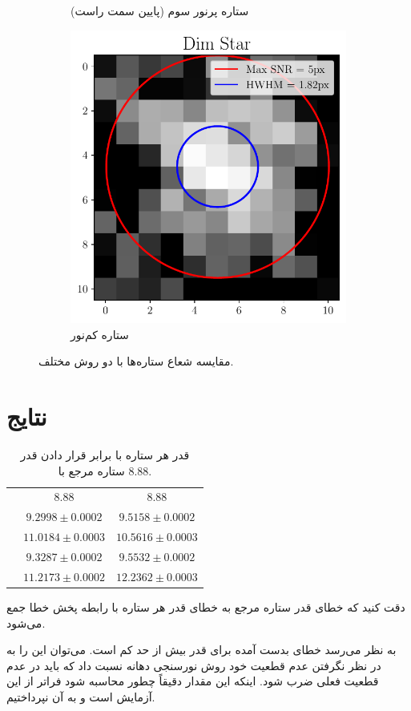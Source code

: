 \documentclass[12pt,a4paper]{article}
\begin{document}
\begin{figure}[h!]
\begin{subfigure}{0.49\linewidth}
			\caption{ستاره پرنور سوم (پایین سمت راست)}
		\end{subfigure}
		\begin{subfigure}{0.49\linewidth}
			\centering
			\includegraphics[width=\linewidth]{../fig/dim}
			\caption{ستاره کم‌نور}
		\end{subfigure}
		\caption{مقایسه شعاع ستاره‌ها با دو روش مختلف.}
	\end{figure}
	\restoregeometry
	\section{نتایج}
	\begin{table}[h!]
		\centering
		\caption{قدر هر ستاره با برابر قرار دادن قدر ستاره مرجع با $8.88$.}
		\begin{LTR}
			\begin{tabular}{|O{c}|c|c|}
				\hline
				 &  &  \\ \hline
				 & $8.88$ & $8.88$ \\ \hline
				 & $9.2998\pm0.0002$ & $9.5158\pm0.0002$ \\ \hline
				 & $11.0184\pm0.0003$ & $10.5616\pm0.0003$ \\ \hline
				 & $9.3287\pm0.0002$ & $9.5532\pm0.0002$ \\ \hline 
				 & $11.2173\pm0.0002$ & $12.2362\pm0.0003$ \\ \hline
			\end{tabular}
		\end{LTR}
	\end{table}
	دقت کنید که خطای قدر ستاره مرجع به خطای قدر هر ستاره با رابطه پخش خطا جمع می‌شود.
	
	به نظر می‌رسد خطای بدست آمده برای قدر بیش از حد کم است. می‌توان این را به در نظر نگرفتن عدم قطعیت خود روش نورسنجی
	دهانه نسبت داد که باید در عدم قطعیت فعلی ضرب شود. اینکه این مقدار دقیقاً چطور محاسبه شود فراتر از این آزمایش است
	و به آن نپرداختیم.
\end{document}
